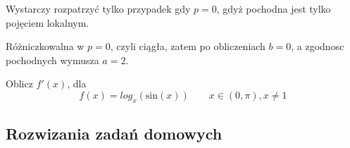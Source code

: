 \documentclass[11pt]{scrartcl}
\begin{document}
Wystarczy rozpatrzyć tylko przypadek gdy $p  = 0$, gdyż pochodna jest tylko pojęciem lokalnym.

Różniczkowalna w $p = 0$, czyli ciągła, zatem po obliczeniach $b = 0$, a zgodnosc pochodnych wymusza $a = 2$.

\begin{zaddom}
    Oblicz $f'(x)$, dla 
    \[
        f(x) = log_x \left ( \text{sin} \left ( x \right )  \right ) \qquad x \in \left (  0, \pi \right ), x \not = 1
    \]
    
\end{zaddom}

  \subsection{Rozwizania zadań domowych}
    
\end{document}
